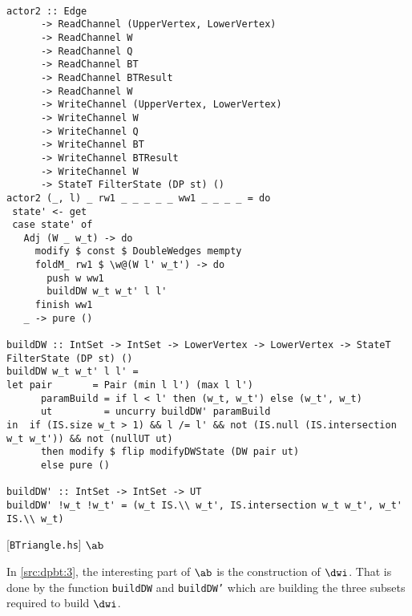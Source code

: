 \begin{listing}[H]
\begin{verbatim}

actor2 :: Edge
      -> ReadChannel (UpperVertex, LowerVertex)
      -> ReadChannel W
      -> ReadChannel Q
      -> ReadChannel BT
      -> ReadChannel BTResult
      -> ReadChannel W
      -> WriteChannel (UpperVertex, LowerVertex)
      -> WriteChannel W
      -> WriteChannel Q
      -> WriteChannel BT
      -> WriteChannel BTResult
      -> WriteChannel W
      -> StateT FilterState (DP st) ()
actor2 (_, l) _ rw1 _ _ _ _ _ ww1 _ _ _ _ = do
 state' <- get
 case state' of
   Adj (W _ w_t) -> do
     modify $ const $ DoubleWedges mempty
     foldM_ rw1 $ \w@(W l' w_t') -> do
       push w ww1
       buildDW w_t w_t' l l'
     finish ww1
   _ -> pure ()

buildDW :: IntSet -> IntSet -> LowerVertex -> LowerVertex -> StateT FilterState (DP st) ()
buildDW w_t w_t' l l' =
let pair       = Pair (min l l') (max l l')
      paramBuild = if l < l' then (w_t, w_t') else (w_t', w_t)
      ut         = uncurry buildDW' paramBuild
in  if (IS.size w_t > 1) && l /= l' && not (IS.null (IS.intersection w_t w_t')) && not (nullUT ut)
      then modify $ flip modifyDWState (DW pair ut)
      else pure ()

buildDW' :: IntSet -> IntSet -> UT
buildDW' !w_t !w_t' = (w_t IS.\\ w_t', IS.intersection w_t w_t', w_t' IS.\\ w_t)

\end{verbatim}
\caption{[\texttt{BTriangle.hs}] $\ab$}
\label{src:dpbt:3}
\end{listing}

In \autoref{src:dpbt:3}, the interesting part of $\ab$ is the construction of $\dwi$. That is done by the function \texttt{buildDW}
and \texttt{buildDW'} which are building the three subsets required to build $\dwi$.

